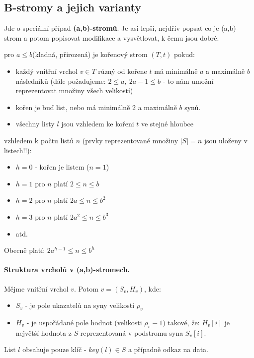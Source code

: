 \documentclass[a4paper]{article}      %
\newenvironment{definition}[1][Definice]{\begin{trivlist}
\item[\hskip \labelsep {\bfseries #1}]}{\end{trivlist}}
\newenvironment{remark}[1][Pozorování]{\begin{trivlist}
\item[\hskip \labelsep {\bfseries #1}]}{\end{trivlist}}
\begin{document}
\subsection{B-stromy a jejich varianty}
Jde o speciální případ \textbf{(a,b)-stromů}. Je asi lepší, nejdřív popsat co je (a,b)-strom a potom popisovat modifikace
a vysvětlovat, k čemu jsou dobré.

\begin{definition}[(a,b)-strom]
pro $a \leq b$(kladná, přirozená) je kořenový strom $(T,t)$ pokud:
\begin{itemize}
	\item každý vnitřní vrchol $v \in T$ různý od kořene $t$ má minimálně $a$ a maximálně $b$ následníků
	(dále požadujeme: $2 \leq a,\ 2a-1 \leq b$ - to nám umožní reprezentovat množiny všech velikostí)
	\item kořen je buď list, nebo má minimálně $2$ a maximálně $b$ synů.
	\item všechny listy $l$ jsou vzhledem ke kořeni $t$ ve stejné hloubce
\end{itemize}
\end{definition}

\begin{remark}[Logaritmická výška] vzhledem k počtu listů $n$ (prvky reprezentované množiny $|S|=n$ jsou uloženy v listech!!):
\begin{itemize}
	\item $h=0$ - kořen je listem ($n=1$)
	\item $h=1$ pro $n$ platí $2 \leq n \leq b$
	\item $h=2$ pro $n$ platí $2a \leq n \leq b^{2}$
	\item $h=3$ pro $n$ platí $2a^{2} \leq n \leq b^{3}$
	\item atd.
\end{itemize}
Obecně platí: $2a^{h-1} \leq n \leq b^{h}$
\end{remark}

\paragraph{Struktura vrcholů v (a,b)-stromech.} Mějme vnitřní vrchol $v$. Potom $v=(S_{v},H_{v})$, kde:
\begin{itemize}
\item $S_{v}$ - je pole ukazatelů na syny velikosti $\rho_{v}$
\item $H_{v}$ - je uspořádané pole hodnot (velikosti $\rho_{v}-1$) takové, že:
$H_{v}[i]$ je největší hodnota z $S$ reprezentovaná v podstromu syna $S_{v}[i]$.
\end{itemize}
List $l$ obsahuje pouze klíč - $key(l)\in S$ a případně odkaz na data.
\end{document}
